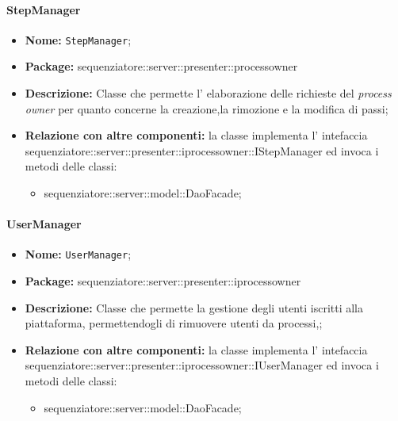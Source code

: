 \paragraph{StepManager}
	\begin{itemize}
		\item \textbf{Nome:} \texttt{StepManager};
		\item \textbf{Package:} sequenziatore::server::presenter::processowner
		\item \textbf{Descrizione:} Classe che permette l' elaborazione delle richieste del \textit{process owner} per quanto concerne la creazione,la rimozione e la modifica di passi;
		\item \textbf{Relazione con altre componenti:} la classe implementa l' intefaccia sequenziatore::server::presenter::iprocessowner::IStepManager ed invoca i metodi delle classi:
		\begin{itemize}
			\item sequenziatore::server::model::DaoFacade;
		\end{itemize}
	\end{itemize}
\paragraph{UserManager}
	\begin{itemize}
		\item \textbf{Nome:} \texttt{UserManager};
		\item \textbf{Package:} sequenziatore::server::presenter::iprocessowner
		\item \textbf{Descrizione:} Classe che permette la gestione degli utenti iscritti alla piattaforma, permettendogli di rimuovere utenti da processi,;
		\item \textbf{Relazione con altre componenti:} la classe implementa l' intefaccia sequenziatore::server::presenter::iprocessowner::IUserManager ed invoca i metodi delle classi:
		\begin{itemize}
			\item sequenziatore::server::model::DaoFacade;
		\end{itemize}
	\end{itemize}

